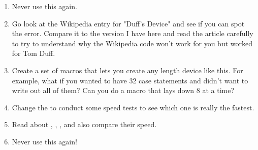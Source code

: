 \begin{enumerate}
\item Never use this again.
\item Go look at the Wikipedia entry for "Duff's Device" and see if you can
    spot the error.  Compare it to the version I have here and read the article
    carefully to try to understand why the Wikipedia code won't work for you
    but worked for Tom Duff.
\item Create a set of macros that lets you create any length device like this.
    For example, what if you wanted to have 32 case statements and didn't want
    to write out all of them? Can you do a macro that lays down 8 at a time?
\item Change the  to conduct some speed tests to see which one is
    really the fastest.
\item Read about , , , and also compare
    their speed.
\item Never use this again!
\end{enumerate}

